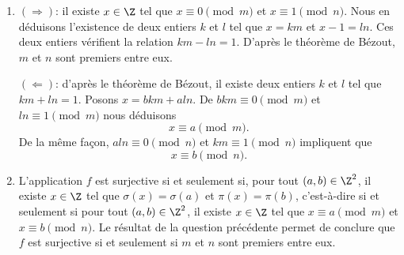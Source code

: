 \begin{enumerate}
  \item
    $(\Rightarrow)$: il existe $x\in\Z$ tel que $x\equiv 0\pmod{m}$ et
    $x\equiv 1\pmod{n}$. Nous en déduisons l'existence de deux entiers $k$ et
    $l$ tel que $x = km$ et $x - 1 = ln$. Ces deux entiers vérifient la relation
    $km - ln = 1$. D'après le théorème de Bézout, $m$ et $n$ sont premiers entre
    eux.

    $(\Leftarrow)$: d'après le théorème de Bézout, il existe deux entiers $k$ et
    $l$ tel que $km + ln = 1$. Posons $x = bkm + aln$.
    De $bkm \equiv 0 \pmod{m}$ et $ln \equiv 1\pmod{m}$ nous déduisons
    \[
      x\equiv a\pmod{m}.
    \]
    De la même façon, $aln \equiv 0 \pmod{n}$ et $km\equiv 1\pmod{n}$ impliquent
    que
    \[
      x\equiv b\pmod{n}.
    \]

  \item
    L'application $f$ est surjective si et seulement si, pour tout
    $(a,b)\in\Z^2$, il existe $x\in\Z$ tel que
    $\sigma(x)=\sigma(a)$ et $\pi(x)=\pi(b)$, c'est-à-dire si et seulement si pour
    tout $(a,b)\in\Z^2$, il existe $x\in\Z$ tel que $x\equiv a\pmod{m}$ et
    $x\equiv b\pmod{n}$. Le résultat de la question précédente permet de
    conclure que $f$ est surjective si et seulement si $m$ et $n$ sont premiers
    entre eux.
\end{enumerate}
